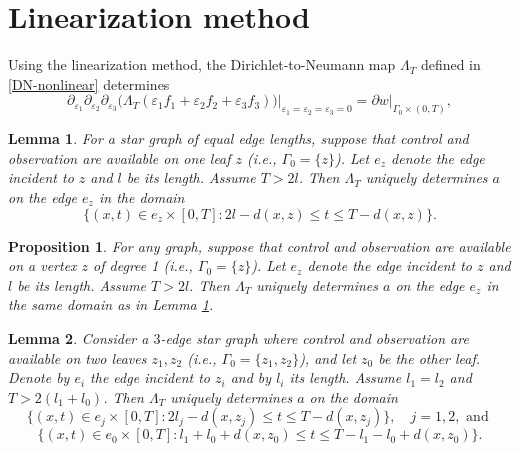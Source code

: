 \documentclass[10pt,a4paper]{amsart}
\newtheorem{lemma}{Lemma}
\newtheorem{proposition}{Proposition}
\begin{document}
 


\section{Linearization method}
\label{sec-linearization}

Using the linearization method, the Dirichlet-to-Neumann map $\Lambda_T$ defined in \eqref{DN-nonlinear} determines
\begin{equation}
\partial_{\varepsilon_1} \partial_{\varepsilon_2} 
\partial_{\varepsilon_3}
\Big(\Lambda_T (\varepsilon_1 f_1+ \varepsilon_2 f_2+\varepsilon_3 f_3)\Big)  \Big|_{\varepsilon_1=\varepsilon_2=\varepsilon_3=0} = \partial w \big|_{\Gamma_0 \times (0,T)},
\end{equation}

\begin{lemma} \label{star-equal}
For a star graph of equal edge lengths, suppose that control and observation are available on one leaf $z$ (i.e., $\Gamma_0=\{z\}$).
Let $e_z$ denote the edge incident to $z$ and $l$ be its length.
Assume $T>2l$.
Then $\Lambda_T$ uniquely determines $a$ on the edge $e_z$ in the domain
$$\Big\{(x,t)\in e_z\times [0,T]: 2l-d(x,z)\leq t\leq T-d(x,z)\Big\}.$$
\end{lemma}

\begin{proposition} \label{star-diff}
For any graph, suppose that control and observation are available on a vertex $z$ of degree 1 (i.e., $\Gamma_0=\{z\}$). {Let $e_z$ denote the edge incident to $z$ and $l$ be its length.
Assume $T>2l$.
Then $\Lambda_T$ uniquely determines $a$ on the edge $e_z$ in the same domain as in Lemma \ref{star-equal}.}
\end{proposition}

\begin{lemma} \label{star-interfere}
Consider a $3$-edge star graph where control and observation are available on two leaves $z_1,z_2$ (i.e., $\Gamma_0=\{z_1,z_2\}$), and let $z_0$ be the other leaf.
Denote by $e_i$ the edge incident to $z_i$ and by $l_i$ its length.
{Assume $l_1=l_2$ and $T>2(l_1+l_0)$.
Then $\Lambda_T$ uniquely determines $a$ on the domain
$$\big\{(x,t)\in e_j\times [0,T]: 2l_j-d(x,z_j)\leq t\leq T-d(x,z_j)  \big\},\quad j=1,2, \textrm{ and }$$
$$\big\{ (x,t)\in e_0\times [0,T]:  l_1+l_0+d(x,z_0) \leq t \leq T-l_1-l_0+d(x,z_0)\big\}.$$}
\end{lemma}
\end{document}

